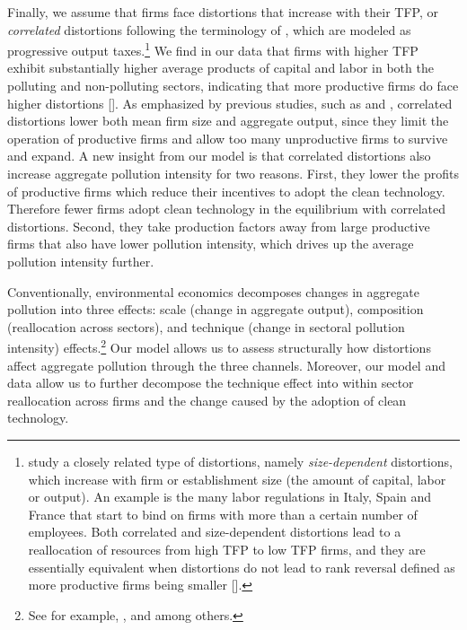 \documentclass[AEJ]{AEA}
\begin{document}
Finally, we assume that firms face distortions that increase with their TFP, or \textit{correlated} distortions following the terminology of \citet{RestucciaRogerson:2008}, which are modeled as progressive output taxes.\footnote{\citet{Guneretal:2008} study a closely related type of distortions, namely \textit{size-dependent} distortions, which increase with firm or establishment size (the amount of capital, labor or output). An example is the many labor regulations in Italy, Spain and France that start to bind on firms with more than a certain number of employees. Both correlated and size-dependent distortions lead to a reallocation of resources from high TFP to low TFP firms, and they are essentially equivalent when distortions do not lead to rank reversal defined as more productive firms being smaller [\citet{Hopenhayn:2014}].} We find in our data that firms with higher TFP exhibit substantially higher average products of capital and labor in both the polluting and non-polluting sectors, indicating that more productive firms do face higher distortions [\citet{HsiehKlenow:2009, HsiehKlenow:2014}]. As emphasized by previous studies, such as \citet{RestucciaRogerson:2008} and \citet{HsiehKlenow:2014}, correlated distortions lower both mean firm size and aggregate output, since they limit the operation of productive firms and allow too many unproductive firms to survive and expand. A new insight from our model is that correlated distortions also increase aggregate pollution intensity for two reasons. First, they lower the profits of productive firms which reduce their incentives to adopt the clean technology. Therefore fewer firms adopt clean technology in the equilibrium with correlated distortions. Second, they take production factors away from large productive firms that also have lower pollution intensity, which drives up the average pollution intensity further.

Conventionally, environmental economics decomposes changes in aggregate pollution into three effects: scale (change in aggregate output), composition (reallocation across sectors), and technique (change in sectoral pollution intensity) effects.\footnote{See for example, \citet{GrossmanKrueger:1993}, \citet{CopelandTaylor:2004} and \citet{Levinson:2009} among others.} Our model allows us to assess structurally how distortions affect aggregate pollution through the three channels. Moreover, our model and data allow us to further decompose the technique effect into within sector reallocation across firms and the change caused by the adoption of clean technology.
\end{document}
